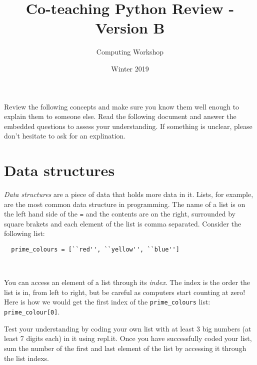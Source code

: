 \documentclass[11pt]{article}
\author{Computing Workshop}
\title{Co-teaching Python Review - Version B}
\date{Winter 2019}
\begin{document}
\maketitle

Review the following concepts and make sure you know them well enough to explain them to someone else. Read the
following document and answer the embedded questions to assess your understanding. If something is unclear, please don't hesitate to ask for an explination.

\section*{Data structures}

\emph{Data structures} are a piece of data that holds more data in it.
Lists, for example, are the most common data structure in programming. The name of a list is on the left hand side of the \texttt{=}
and the contents are on the right, surrounded by square brakets and each element of the list is comma separated. Consider the following list:

\begin{lstlisting}
  prime_colours = [``red'', ``yellow'', ``blue'']
\end{lstlisting}
~

You can access an element of a list through its \emph{index}. The index is the order the list is in, from left to right,
but be careful as computers start counting at zero! Here is how we would get the first index of the \texttt{prime\_colours}
list: \texttt{prime\_colour[0]}.

Test your understanding by coding your own list with at least 3 big numbers (at least 7 digits each) in it using repl.it. Once you have successfully
coded your list, sum the number of the first and last element of the list by accessing it through the list indexs.
\end{document}
